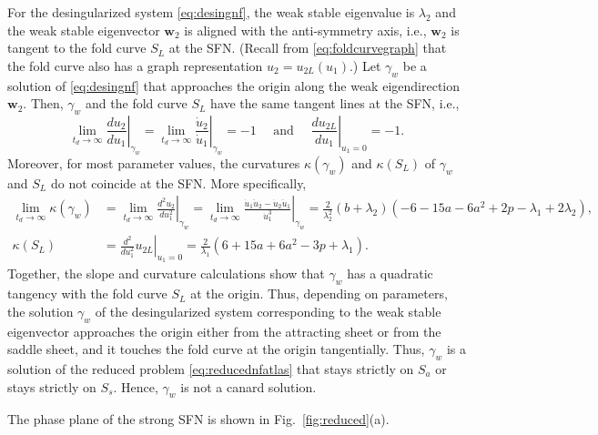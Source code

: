 \documentclass[10pt,onecolumn]{article}
\theoremstyle{plain}
\begin{document}
For the desingularized system \eqref{eq:desingnf}, the weak stable eigenvalue is $\lambda_2$ and the weak stable eigenvector $\boldsymbol w_2$ is aligned with the anti-symmetry axis, i.e., $\boldsymbol w_2$ is tangent to the fold curve $S_L$ at the SFN. 
(Recall from \eqref{eq:foldcurvegraph} that the fold curve also has a graph representation $u_2=u_{2L}(u_1)$.)
Let $\gamma_w$ be a solution of \eqref{eq:desingnf} that approaches the origin along the weak eigendirection $\boldsymbol w_2$. 
Then, $\gamma_w$ and the fold curve $S_L$ have the same tangent lines at the SFN, i.e., 
%
\[ \lim_{t_d \to \infty} \left. \frac{du_2}{d u_1} \right|_{\gamma_w} = \lim_{t_d \to \infty} \left. \frac{\dot u_2}{\dot u_1} \right|_{\gamma_w} = -1 
\quad \text{ and } \quad
\left. \frac{du_{2L}}{du_1}  \right|_{u_1=0} = -1. \]
%
Moreover, for most parameter values, the curvatures $\kappa(\gamma_w)$ and $\kappa(S_L)$ of $\gamma_w$ and $S_L$ do not coincide at the SFN. More specifically, 
%
\begin{equation*} 
  \begin{split}
	\lim_{t_d \to \infty}\kappa\left( \gamma_w\right) &= \lim_{t_d \to \infty} \left. \frac{d^2u_2}{d u_1^2} \right|_{\gamma_w} = \lim_{t_d \to \infty} \left. \frac{\dot u_1 \ddot u_2 - \dot u_2 \ddot u_1}{\dot u_1^3} \right|_{\gamma_w}  = \tfrac{2}{\lambda_2^2}(b+\lambda_2)(-6-15a-6a^2+2p-\lambda_1+2\lambda_2), \\
	\kappa\left(S_L\right) &= \left. \frac{d^2}{du_1^2} u_{2L} \right|_{u_1=0} = \tfrac{2}{\lambda_1} \left( 6+15a+6a^2-3p+\lambda_1 \right).
  \end{split}
\end{equation*}
%
Together, the slope and curvature calculations show that $\gamma_w$ has a quadratic tangency with the fold curve $S_L$ at the origin.
Thus, depending on parameters, the solution $\gamma_w$ of the desingularized system corresponding to the weak stable eigenvector approaches the origin either from the attracting sheet or from the saddle sheet, and it touches the fold curve at the origin tangentially. Thus, $\gamma_w$ is a solution of the reduced problem \eqref{eq:reducednfatlas} that stays strictly on $S_a$ or stays strictly on $S_s$. Hence, $\gamma_w$ is not a canard solution. 


The phase plane of the strong SFN is shown in Fig.~\ref{fig:reduced}(a).
\end{document}
